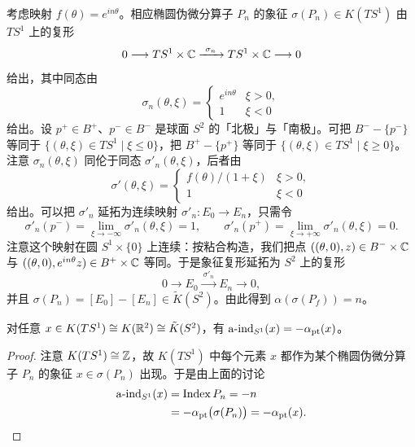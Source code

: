 \begin{example}
考虑映射 $f(\theta)=e^{in\theta}$。相应椭圆伪微分算子 $P_n$ 的象征 $\sigma(P_n)\in K(TS^1)$ 由 $TS^1$ 上的复形
\[
0\longrightarrow TS^1\times\mathbb{C}\xrightarrow{\ \sigma_n\ }TS^1\times\mathbb{C}\longrightarrow 0
\]
给出，其中同态由
\[
\sigma_n(\theta,\xi)=\begin{cases} e^{in\theta} & \xi>0,\\ 1 & \xi<0 \end{cases}
\]
给出。设 $p^+\in B^+$、$p^-\in B^-$ 是球面 $S^2$ 的「北极」与「南极」。可把 $B^--\{p^-\}$ 等同于 $\{(\theta,\xi)\in TS^1\mid\xi\le0\}$，把 $B^+-\{p^+\}$ 等同于 $\{(\theta,\xi)\in TS^1\mid\xi\ge0\}$。注意 $\sigma_n(\theta,\xi)$ 同伦于同态 $\sigma'_n(\theta,\xi)$，后者由
\[
\sigma'(\theta,\xi)=\begin{cases} f(\theta)/(1+\xi) & \xi>0,\\ 1 & \xi<0 \end{cases}
\]
给出。可以把 $\sigma'_n$ 延拓为连续映射 $\sigma'_n:E_0\to E_n$，只需令
\[
\sigma'_n(p^-)=\lim_{\xi\to-\infty}\sigma'_n(\theta,\xi)=1,\qquad
\sigma'_n(p^+)=\lim_{\xi\to+\infty}\sigma'_n(\theta,\xi)=0.
\]
注意这个映射在圆 $S^1\times\{0\}$ 上连续：按粘合构造，我们把点 $((\theta,0),z)\in B^-\times\mathbb{C}$ 与 $((\theta,0),e^{in\theta}z)\in B^+\times\mathbb{C}$ 等同。于是象征复形延拓为 $S^2$ 上的复形
\[
0\longrightarrow E_0\xrightarrow{\ \sigma'_n\ }E_n\longrightarrow 0,
\]
并且 $\sigma(P_n)=[E_0]-[E_n]\in\tilde K(S^2)$。由此得到 $\alpha(\sigma(P_f))=n$。
\end{example}

\begin{proposition}
对任意 $x\in K(TS^1)\cong K(\mathbb{R}^2)\cong\tilde K(S^2)$，有 $\operatorname{a\text{-}ind}_{S^1}(x)=-\alpha_{\mathrm{pt}}(x)$。
\end{proposition}

\begin{proof}
注意 $K(TS^1)\cong\mathbb{Z}$，故 $K(TS^1)$ 中每个元素 $x$ 都作为某个椭圆伪微分算子 $P_n$ 的象征 $x\in\sigma(P_n)$ 出现。于是由上面的讨论
\[
\begin{aligned}
\operatorname{a\text{-}ind}_{S^1}(x)&=\operatorname{Index} P_n=-n\\
&=-\alpha_{\mathrm{pt}}\bigl(\sigma(P_n)\bigr)=-\alpha_{\mathrm{pt}}(x).
\end{aligned}
\]
\end{proof}

